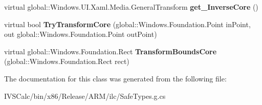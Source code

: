 \begin{DoxyCompactItemize}
virtual global\+::\+Windows.\+U\+I.\+Xaml.\+Media.\+General\+Transform {\bfseries get\+\_\+\+Inverse\+Core} ()
\item 
\mbox{\label{class_windows_1_1_u_i_1_1_xaml_1_1_media_1_1_general_transform_aa7cc04e60b1e0ab4460a3aa82b822be3}} 
virtual bool {\bfseries Try\+Transform\+Core} (global\+::\+Windows.\+Foundation.\+Point in\+Point, out global\+::\+Windows.\+Foundation.\+Point out\+Point)
\item 
\mbox{\label{class_windows_1_1_u_i_1_1_xaml_1_1_media_1_1_general_transform_a87c2edc3cf75f7b47f399befb5496002}} 
virtual global\+::\+Windows.\+Foundation.\+Rect {\bfseries Transform\+Bounds\+Core} (global\+::\+Windows.\+Foundation.\+Rect rect)
\end{DoxyCompactItemize}


The documentation for this class was generated from the following file\+:\begin{DoxyCompactItemize}
\item 
I\+V\+S\+Calc/bin/x86/\+Release/\+A\+R\+M/ilc/Safe\+Types.\+g.\+cs\end{DoxyCompactItemize}

